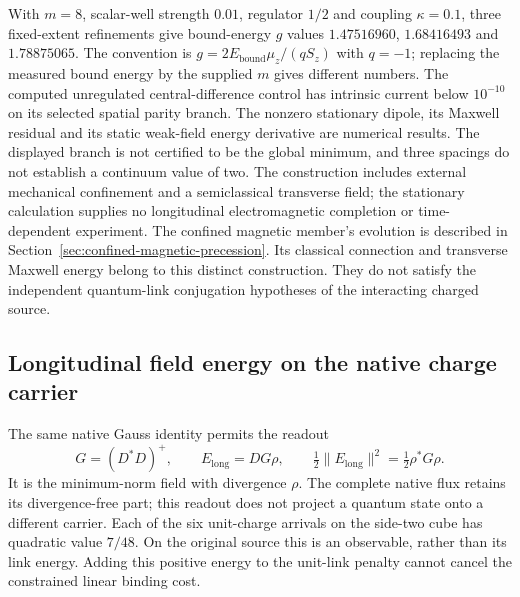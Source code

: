 With $m=8$, scalar-well strength $0.01$, regulator $1/2$ and coupling
$\kappa=0.1$, three fixed-extent refinements give bound-energy
$g$ values $1.47516960$, $1.68416493$ and $1.78875065$.
The convention is $g=2E_{\mathrm{bound}}\mu_z/(qS_z)$ with
$q=-1$; replacing the measured bound energy by the supplied $m$
gives different numbers. The computed unregulated central-difference
control has intrinsic current below $10^{-10}$ on its selected spatial
parity branch.
The nonzero stationary dipole, its Maxwell residual and its static
weak-field energy derivative are numerical results. The displayed
branch is not certified to be the global minimum, and three spacings
do not establish a continuum value of two. The construction includes
external mechanical confinement and a semiclassical transverse field;
the stationary calculation supplies no longitudinal electromagnetic
completion or time-dependent experiment. The confined magnetic member's
evolution is described in Section~\ref{sec:confined-magnetic-precession}.
Its classical connection and transverse Maxwell energy belong to this
distinct construction. They do not satisfy the independent quantum-link
conjugation hypotheses of the interacting charged source.

\subsection{Longitudinal field energy on the native charge carrier}

The same native Gauss identity permits the readout
\[
 G=(D^*D)^+,\qquad E_{\mathrm{long}}=DG\rho,
 \qquad \tfrac12\|E_{\mathrm{long}}\|^2=\tfrac12\rho^*G\rho.
\]
It is the minimum-norm field with divergence $\rho$. The complete
native flux retains its divergence-free part; this readout does not
project a quantum state onto a different carrier. Each of the six
unit-charge arrivals on the side-two cube has quadratic value $7/48$.
On the original source this is an observable, rather than its link
energy. Adding this positive energy to the unit-link penalty cannot
cancel the constrained linear binding cost.


